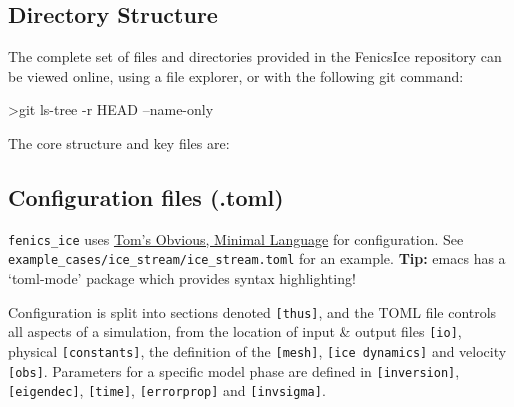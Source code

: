 \documentclass[11pt, reqno, nocenter]{article}
\begin{document}
\subsection{Directory Structure}

The complete set of files and directories provided in the FenicsIce repository can be viewed online, using a file explorer, or with the following git command:
\begin{spverbatim}
>git ls-tree -r HEAD --name-only
\end{spverbatim}

The core structure and key files are: \\


\subsection{Configuration files (.toml)}

{\tt fenics\_ice} uses \href{https://github.com/toml-lang/toml}{Tom's Obvious, Minimal Language} for configuration. See\\ {\tt example\_cases/ice\_stream/ice\_stream.toml} for an example.
\textbf{Tip:} emacs has a `toml-mode' package which provides syntax highlighting!

Configuration is split into sections denoted {\tt [thus]}, and the TOML file controls all aspects of a simulation, from the location of input \& output files {\tt [io]}, physical {\tt [constants]}, the definition of the {\tt [mesh]}, {\tt [ice dynamics]} and velocity {\tt [obs]}. Parameters for a specific model phase are defined in {\tt [inversion]}, {\tt [eigendec]}, {\tt [time]}, {\tt [errorprop]} and {\tt [invsigma]}.
\end{document}
